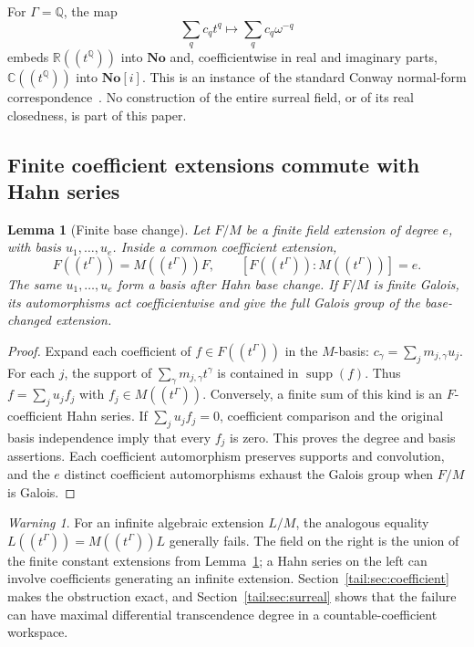 \documentclass[11pt,a4paper]{article}
\numberwithin{equation}{section}
\newtheorem{lemma}[theorem]{Lemma}
\theoremstyle{definition}
\theoremstyle{remark}
\newtheorem{warning}[theorem]{Warning}
\newcommand{\No}{\mathbf{No}}
\newcommand{\R}{\mathbb R}
\newcommand{\C}{\mathbb C}
\newcommand{\Q}{\mathbb Q}
\newcommand{\supp}{\operatorname{supp}}
\begin{document}
For $\Gamma=\Q$, the map
\begin{equation}\label{tail:eq:embedding}
 \sum_q c_qt^q\longmapsto\sum_q c_q\omega^{-q}
\end{equation}
embeds $\R((t^\Q))$ into $\No$ and, coefficientwise in real and imaginary
parts, $\C((t^\Q))$ into $\No[i]$. This is an instance of the standard
Conway normal-form correspondence~\cite{KKS}. No construction of the
entire surreal field, or of its real closedness, is part of this paper.

\subsection{Finite coefficient extensions commute with Hahn series}
\begin{lemma}[Finite base change]\label{tail:lem:basechange}
Let $F/M$ be a finite field extension of degree $e$, with basis
$u_1,\ldots,u_e$. Inside a common coefficient extension,
\[
 F((t^\Gamma))=M((t^\Gamma))F,
 \qquad [F((t^\Gamma)):M((t^\Gamma))]=e.
\]
The same $u_1,\ldots,u_e$ form a basis after Hahn base change. If $F/M$
is finite Galois, its automorphisms act coefficientwise and give the full
Galois group of the base-changed extension.
\end{lemma}
\begin{proof}
Expand each coefficient of $f\in F((t^\Gamma))$ in the $M$-basis:
$c_\gamma=\sum_j m_{j,\gamma}u_j$. For each $j$, the support of
$\sum_\gamma m_{j,\gamma}t^\gamma$ is contained in $\supp(f)$.
Thus $f=\sum_j u_j f_j$ with $f_j\in M((t^\Gamma))$.
Conversely, a finite sum of this kind is an $F$-coefficient Hahn series.
If $\sum_j u_j f_j=0$, coefficient comparison and the original basis
independence imply that every $f_j$ is zero. This proves the degree and
basis assertions. Each coefficient automorphism preserves supports and
convolution, and the $e$ distinct coefficient automorphisms exhaust the
Galois group when $F/M$ is Galois.
\end{proof}

\begin{warning}\label{tail:warn:infinitebase}
For an infinite algebraic extension $L/M$, the analogous equality
$L((t^\Gamma))=M((t^\Gamma))L$ generally fails. The field on the right is
the union of the finite constant extensions from Lemma~\ref{tail:lem:basechange};
a Hahn series on the left can involve coefficients generating an infinite
extension. Section~\ref{tail:sec:coefficient} makes the obstruction exact, and
Section~\ref{tail:sec:surreal} shows that the failure can have maximal
differential transcendence degree in a countable-coefficient workspace.
\end{warning}
\end{document}
